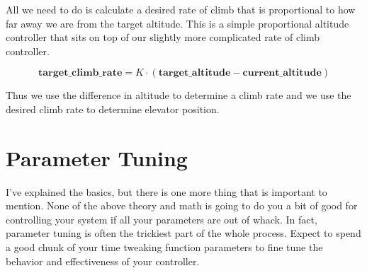 \documentclass[12pt]{article}
\begin{document}
All we need to do is calculate a desired rate of climb that is
proportional to how far away we are from the target altitude.  This is
a simple proportional altitude controller that sits on top of our
slightly more complicated rate of climb controller.

\[
\mathbf{target\_climb\_rate} = K \cdot ( \mathbf{target\_altitude} - 
	\mathbf{current\_altitude} )
\]

Thus we use the difference in altitude to determine a climb rate and
we use the desired climb rate to determine elevator position.


\section{Parameter Tuning}

I've explained the basics, but there is one more thing that is
important to mention.  None of the above theory and math is going to
do you a bit of good for controlling your system if all your
parameters are out of whack.  In fact, parameter tuning is often the
trickiest part of the whole process.  Expect to spend a good chunk of
your time tweaking function parameters to fine tune the behavior and
effectiveness of your controller.
\end{document}
